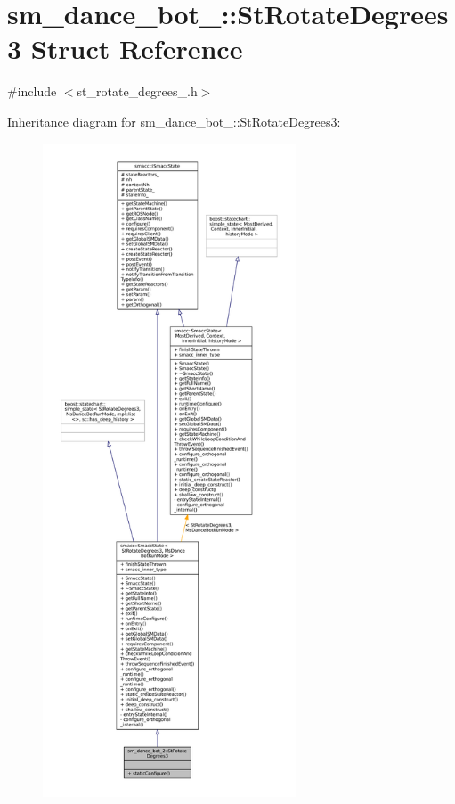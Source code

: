 \hypertarget{structsm__dance__bot__2_1_1StRotateDegrees3}{}\section{sm\+\_\+dance\+\_\+bot\+\_\+:\+:St\+Rotate\+Degrees3 Struct Reference}
\label{structsm__dance__bot__2_1_1StRotateDegrees3}


{\ttfamily \#include $<$st\+\_\+rotate\+\_\+degrees\+\_.\+h$>$}



Inheritance diagram for sm\+\_\+dance\+\_\+bot\+\_\+:\+:St\+Rotate\+Degrees3\+:
\nopagebreak
\begin{figure}[H]
\begin{center}
\leavevmode
\includegraphics[height=550pt]{structsm__dance__bot__2_1_1StRotateDegrees3__inherit__graph}
\end{center}
\end{figure}


